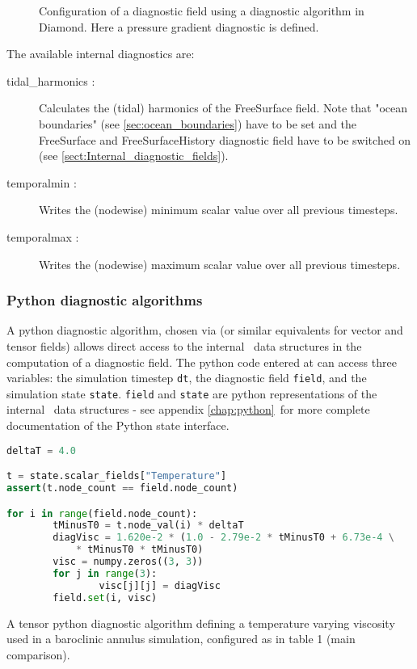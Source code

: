 \begin{figure}[ht]
  \centering
  \caption{Configuration of a diagnostic field using a diagnostic algorithm in
           Diamond. Here a pressure gradient diagnostic is defined.}
  \label{fig:diagnostic_algorithm}
\end{figure}

The available internal   diagnostics are:
\begin{description}
\item[tidal\_harmonics :] Calculates the (tidal) harmonics of the FreeSurface field. Note that "ocean boundaries" (see \ref{sec:ocean_boundaries}) have to be set and the FreeSurface and FreeSurfaceHistory diagnostic field have to be switched on (see \ref{sect:Internal_diagnostic_fields}).  
\item[temporalmin :] Writes the (nodewise) minimum scalar value over all previous timesteps.
\item[temporalmax :] Writes the (nodewise) maximum scalar value over all previous timesteps.
\end{description}        


\subsubsection{Python diagnostic algorithms}

A python diagnostic algorithm, chosen via 
(or similar equivalents for vector and tensor fields) allows direct access to the
internal \fluidity\ data structures in the computation of a diagnostic field. The
python code entered at 
can access three variables: the simulation timestep \lstinline[language = Python]*dt*,
the diagnostic field \lstinline[language = Python]*field*, and the simulation state
\lstinline[language = Python]*state*. \lstinline[language = Python]*field* and
\lstinline[language = Python]*state* are python representations of the internal
\fluidity\ data structures - see appendix \ref{chap:python}\ for more
complete documentation of the Python state interface.

\begin{example}
\begin{lstlisting}[language = Python]
deltaT = 4.0

t = state.scalar_fields["Temperature"]
assert(t.node_count == field.node_count)

for i in range(field.node_count):
        tMinusT0 = t.node_val(i) * deltaT
        diagVisc = 1.620e-2 * (1.0 - 2.79e-2 * tMinusT0 + 6.73e-4 \
            * tMinusT0 * tMinusT0)
        visc = numpy.zeros((3, 3))
        for j in range(3):
                visc[j][j] = diagVisc
        field.set(i, visc)
\end{lstlisting}
\caption{A tensor python diagnostic algorithm defining a temperature varying
         viscosity used in a baroclinic annulus simulation, configured
         as in \citet{hignett1985} table 1 (main comparison).}
\end{example}

